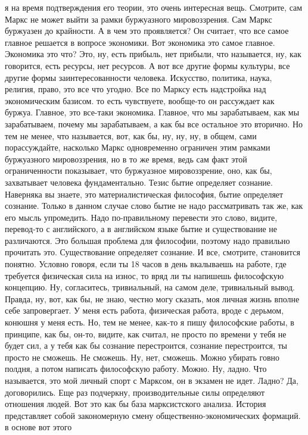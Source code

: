 я на время подтверждения его теории, это очень интересная вещь. Смотрите, сам
Маркс не может выйти за рамки буржуазного мировоззрения. Сам Маркс буржуазен до
крайности. А в чем это проявляется? Он считает, что все самое главное решается в
вопросе экономики. Вот экономика это самое главное. Экономика это что? Это, ну,
есть прибыль, нет прибыли, что называется, ну, как говорится, есть ресурсы, нет
ресурсов. А вот все другие формы культуры, все другие формы заинтересованности
человека. Искусство, политика, наука, религия, право, это все что угодно. Все по
Марксу есть надстройка над экономическим базисом. то есть чувствуете, вообще-то
он рассуждает как буржуа. Главное, это все-таки экономика. Главное, что мы
зарабатываем, как мы зарабатываем, почему мы зарабатываем, а как бы все
остальное это вторично. Но тем не менее, что называется, вот, как бы, ну, ну,
ну, в общем, сами порассуждайте, насколько Маркс одновременно ограничен этим
рамками буржуазного мировоззрения, но в то же время, ведь сам факт этой
ограниченности показывает, что буржуазное мировоззрение, оно, как бы,
захватывает человека фундаментально. Тезис бытие определяет сознание. Наверняка
вы знаете, это материалистическая философия, бытие определяет сознание. Только в
данном случае слово бытие не надо рассматривать так же, как его мысль
упромедить. Надо по-правильному перевести это слово, видите, перевод-то с
английского, а в английском языке бытие и существование не различаются. Это
большая проблема для философии, поэтому надо правильно прочитать это.
Существование определяет сознание. И все, смотрите, становится понятно. Условно
говоря, если ты 18 часов в день вкалываешь на работе, где требуется физическая
сила на износ, то вряд ли ты напишешь философскую концепцию. Ну, согласитесь,
тривиальный, на самом деле, тривиальный вывод. Правда, ну, вот, как бы, не знаю,
честно могу сказать, моя личная жизнь вполне себе запровергает. У меня есть
работа, физическая работа, вроде с дерьмом, конюшня у меня есть. Но, тем не
менее, как-то я пишу философские работы, в принципе, как бы, он-то, видите, как
считал, не просто по времени у тебя не будет сил, а у тебя как бы сознание
перестроится, сознание перестроится, ты просто не сможешь. Не сможешь. Ну, нет,
сможешь. Можно убирать говно полдня, а потом написать философскую работу. Можно.
Ну, ладно. Что называется, это мой личный спорт с Марксом, он в экзамен не идет.
Ладно? Да, договорились. Еще раз подчеркну, производительные силы определяют
отношения людей. Вот это как бы база марксистского анализа. История представляет
собой закономерную смену общественно-экономических формаций. в основе вот этого
